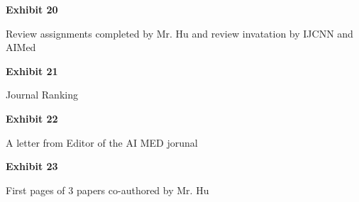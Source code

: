 \documentclass{article}
\begin{document}
% 

% 



\vspace*{\fill}
\begin{center}
{\LARGE \bf
Exhibit 20
}

\vspace{10\baselineskip}

{\large Review assignments completed by Mr. Hu and review invatation by IJCNN and AIMed}

\end{center}
\vspace*{\fill}

% 

\vspace*{\fill}
\begin{center}
{\LARGE \bf
Exhibit 21
}

\vspace{10\baselineskip}

{\large Journal Ranking}

\end{center}
\vspace*{\fill}

%


\vspace*{\fill}
\begin{center}
{\LARGE \bf
Exhibit 22
}

\vspace{10\baselineskip}

{\large A letter from Editor of the AI MED jorunal}

\end{center}
\vspace*{\fill}


% 



\vspace*{\fill}
\begin{center}
{\LARGE \bf
Exhibit 23
}

\vspace{10\baselineskip}

{\large First pages of 3 papers co-authored by Mr. Hu}

\end{center}
\vspace*{\fill}
\end{document}
